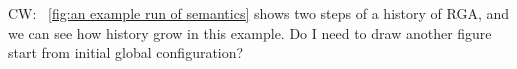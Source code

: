  {\color {red} CW: \figurename~\ref{fig:an example run of semantics} shows two steps of a history of RGA, and we can see how history grow in this example. Do I need to draw another figure start from initial global configuration?}

%

%
%
%
%
%

